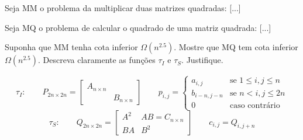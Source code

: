 Seja MM o problema da multiplicar duas matrizes quadradas: [...]

Seja MQ o problema de calcular o quadrado de uma matriz quadrada: [...]

Suponha que MM tenha cota inferior $\Omega\left(n^{2.5}\right)$. Mostre que MQ tem cota inferior $\Omega\left(n^{2.5}\right)$. Descreva claramente as funções $\tau_I$ e $\tau_S$. Justifique.

\itemdsep

\[
    \tau_I:
    \qquad
    P_{2n \times 2n} = \begin{bmatrix}
        A_{n \times n} & \\
         & B_{n \times n}
    \end{bmatrix}
    \qquad
    p_{i,j} = \begin{cases}
        a_{i,j} & \text{se $1 \leq i,j \leq n$} \\
        b_{i-n,j-n} & \text{se $n < i,j \leq 2n$} \\
        0 & \text{caso contrário}
    \end{cases}
\]
\[
    \tau_S:
    \qquad
    Q_{2n \times 2n} = \begin{bmatrix}
        A^2 & A B = C_{n \times n} \\
        B A & B^2
    \end{bmatrix}
    \qquad
    c_{i,j} = Q_{i,j+n}
\]
